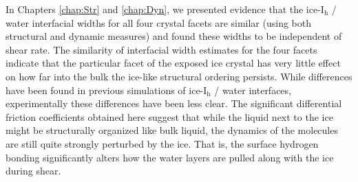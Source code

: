 In Chapters \ref{chap:Str} and \ref{chap:Dyn}, we presented evidence
that the ice-I$_\mathrm{h}$ / water interfacial widths for all four
crystal facets are similar (using both structural and dynamic
measures) and found these widths to be independent of shear rate.  The
similarity of interfacial width estimates for the four facets indicate
that the particular facet of the exposed ice crystal has very little
effect on how far into the bulk the ice-like structural ordering
persists. While differences have been found in previous simulations of
ice-I$_\mathrm{h}$ / water interfaces,\cite{Hayward2001,Hayward2002}
experimentally these differences have been less
clear.\cite{Beaglehole1993} The significant differential friction
coefficients obtained here suggest that while the liquid next to the
ice might be structurally organized like bulk liquid, the dynamics of
the molecules are still quite strongly perturbed by the ice.  That is,
the surface hydrogen bonding significantly alters how the water layers
are pulled along with the ice during shear.


